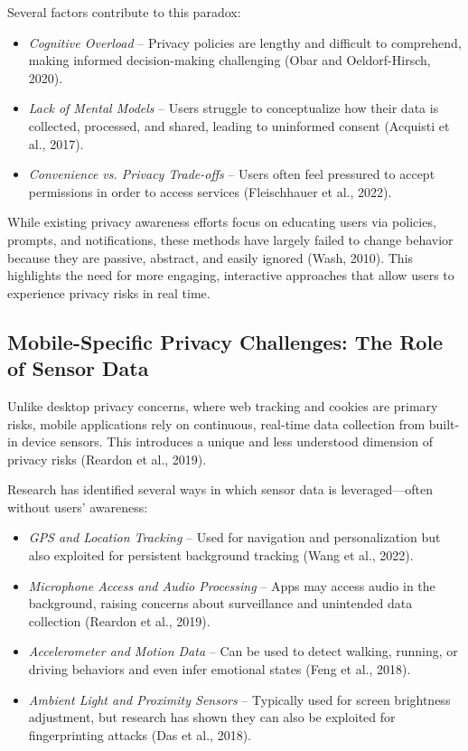 \documentclass[acmlarge, nonacm]{acmart}
\begin{document}
Several factors contribute to this paradox:
\begin{itemize}
    \item \textit{Cognitive Overload} – Privacy policies are lengthy and difficult to comprehend, making informed decision-making challenging (Obar and Oeldorf-Hirsch, 2020).
    \item \textit{Lack of Mental Models} – Users struggle to conceptualize how their data is collected, processed, and shared, leading to uninformed consent (Acquisti et al., 2017).
    \item \textit{Convenience vs. Privacy Trade-offs} – Users often feel pressured to accept permissions in order to access services (Fleischhauer et al., 2022).
\end{itemize}

While existing privacy awareness efforts focus on educating users via policies, prompts, and notifications, these methods have largely failed to change behavior because they are passive, abstract, and easily ignored (Wash, 2010). This highlights the need for more engaging, interactive approaches that allow users to experience privacy risks in real time.

\subsection{Mobile-Specific Privacy Challenges: The Role of Sensor Data}
Unlike desktop privacy concerns, where web tracking and cookies are primary risks, mobile applications rely on continuous, real-time data collection from built-in device sensors. This introduces a unique and less understood dimension of privacy risks (Reardon et al., 2019).

Research has identified several ways in which sensor data is leveraged—often without users’ awareness:
\begin{itemize}
    \item \textit{GPS and Location Tracking }– Used for navigation and personalization but also exploited for persistent background tracking (Wang et al., 2022).
    \item \textit{Microphone Access and Audio Processing} – Apps may access audio in the background, raising concerns about surveillance and unintended data collection (Reardon et al., 2019).
    \item \textit{Accelerometer and Motion Data} – Can be used to detect walking, running, or driving behaviors and even infer emotional states (Feng et al., 2018).
    \item \textit{Ambient Light and Proximity Sensors} – Typically used for screen brightness adjustment, but research has shown they can also be exploited for fingerprinting attacks (Das et al., 2018).
\end{itemize}
\end{document}
